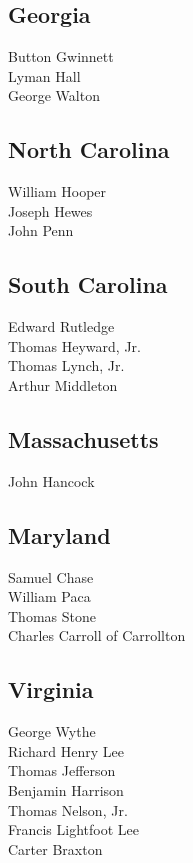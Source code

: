 \documentclass[a4paper,landscape,10pt]{article}
\begin{document}
\begin{multicols}{7}
	\fussy
\subsection*{Georgia}

Button Gwinnett\\
Lyman Hall\\
George Walton

\subsection*{North Carolina}

William Hooper\\
Joseph Hewes\\
John Penn

\subsection*{South Carolina}

Edward Rutledge\\
Thomas Heyward, Jr.\\
Thomas Lynch, Jr.\\
Arthur Middleton

\subsection*{Massachusetts}

John Hancock

\subsection*{Maryland}

Samuel Chase\\
William Paca\\
Thomas Stone\\
Charles Carroll of Carrollton

\subsection*{Virginia}

George Wythe\\
Richard Henry Lee\\
Thomas Jefferson\\
Benjamin Harrison\\
Thomas Nelson, Jr.\\
Francis Lightfoot Lee\\
Carter Braxton


\end{multicols}
\end{document}
